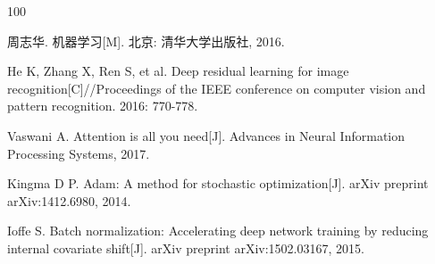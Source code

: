 
{}
\begin{thebibliography}{100}

周志华. 机器学习[M]. 北京: 清华大学出版社, 2016.

He K, Zhang X, Ren S, et al. Deep residual learning for image recognition[C]//Proceedings of the IEEE conference on computer vision and pattern recognition. 2016: 770-778.

Vaswani A. Attention is all you need[J]. Advances in Neural Information Processing Systems, 2017.

Kingma D P. Adam: A method for stochastic optimization[J]. arXiv preprint arXiv:1412.6980, 2014.

Ioffe S. Batch normalization: Accelerating deep network training by reducing internal covariate shift[J]. arXiv preprint arXiv:1502.03167, 2015.

\end{thebibliography}
